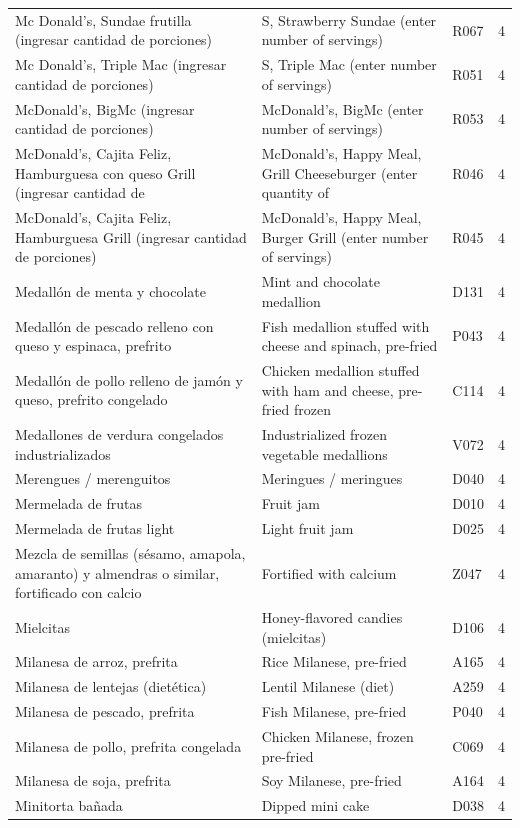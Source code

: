 {\begin{longtable}{p{4.3cm}p{5.5cm}p{1.5cm}p{0.7cm}}
Mc Donald’s, Sundae frutilla (ingresar cantidad de porciones) & S, Strawberry Sundae (enter number of servings) & R067 & 4\\
Mc Donald’s, Triple Mac (ingresar cantidad de porciones) & S, Triple Mac (enter number of servings) & R051 & 4\\
McDonald's, BigMc (ingresar cantidad de porciones) & McDonald's, BigMc (enter number of servings) & R053 & 4\\
McDonald's, Cajita Feliz, Hamburguesa con queso Grill (ingresar cantidad de & McDonald's, Happy Meal, Grill Cheeseburger (enter quantity of & R046 & 4\\
McDonald's, Cajita Feliz, Hamburguesa Grill (ingresar cantidad de porciones) & McDonald's, Happy Meal, Burger Grill (enter number of servings) & R045 & 4\\
Medallón de menta y chocolate & Mint and chocolate medallion & D131 & 4\\
Medallón de pescado relleno con queso y espinaca, prefrito & Fish medallion stuffed with cheese and spinach, pre-fried & P043 & 4\\
Medallón de pollo relleno de jamón y queso, prefrito congelado & Chicken medallion stuffed with ham and cheese, pre-fried frozen & C114 & 4\\
Medallones de verdura congelados industrializados & Industrialized frozen vegetable medallions & V072 & 4\\
Merengues / merenguitos & Meringues / meringues & D040 & 4\\
Mermelada de frutas & Fruit jam & D010 & 4\\
Mermelada de frutas light & Light fruit jam & D025 & 4\\
Mezcla de semillas (sésamo, amapola, amaranto) y almendras o similar, fortificado con calcio & Fortified with calcium & Z047 & 4\\
Mielcitas & Honey-flavored candies (mielcitas) & D106 & 4\\
Milanesa de arroz, prefrita & Rice Milanese, pre-fried & A165 & 4\\
Milanesa de lentejas (dietética) & Lentil Milanese (diet) & A259 & 4\\
Milanesa de pescado, prefrita & Fish Milanese, pre-fried & P040 & 4\\
Milanesa de pollo, prefrita congelada & Chicken Milanese, frozen pre-fried & C069 & 4\\
Milanesa de soja, prefrita & Soy Milanese, pre-fried & A164 & 4\\
Minitorta bañada & Dipped mini cake & D038 & 4\\

\end{longtable}}
